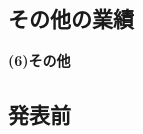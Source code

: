 {\begin{small}
\subsection{その他の業績}
		\noindent
		{\bf (6)その他}
{%
}%

\subsection{発表前}
		\noindent
{%
}%

	\end{small}

    }
\KLEndSinglePage

